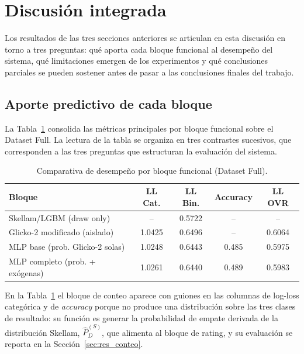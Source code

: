 
\section{Discusi\'on integrada}
\label{sec:res_discusion}

Los resultados de las tres secciones anteriores se articulan en esta discusi\'on en torno a tres preguntas: qu\'e aporta cada bloque funcional al desempe\~no del sistema, qu\'e limitaciones emergen de los experimentos y qu\'e conclusiones parciales se pueden sostener antes de pasar a las conclusiones finales del trabajo.

\subsection{Aporte predictivo de cada bloque}
\label{subsec:res_jerarquia}

La Tabla~\ref{tab:comparativa_bloques} consolida las m\'etricas principales por bloque funcional sobre el Dataset Full. La lectura de la tabla se organiza en tres contrastes sucesivos, que corresponden a las tres preguntas que estructuran la evaluaci\'on del sistema.

\begin{table}[htbp]
	\centering
	\caption{Comparativa de desempe\~no por bloque funcional (Dataset Full).}
	\label{tab:comparativa_bloques}
	\begin{tabular}{lcccc}
		\toprule
		\textbf{Bloque} & \textbf{LL Cat.} & \textbf{LL Bin.} & \textbf{Accuracy} & \textbf{LL OVR} \\
		\midrule
		Skellam/LGBM (draw only) & -- & 0.5722 & -- & -- \\
		Glicko-2 modificado (aislado) & 1.0425 & 0.6496 & -- & 0.6064 \\
		MLP base (prob. Glicko-2 solas) & 1.0248 & 0.6443 & 0.485 & 0.5975 \\
		MLP completo (prob. + ex\'ogenas) & 1.0261 & 0.6440 & 0.489 & 0.5983 \\
		\bottomrule
	\end{tabular}
\end{table}

En la Tabla~\ref{tab:comparativa_bloques} el bloque de conteo aparece con guiones en las columnas de log-loss categ\'orica y de \textit{accuracy} porque no produce una distribuci\'on sobre las tres clases de resultado: su funci\'on es generar la probabilidad de empate derivada de la distribuci\'on Skellam, $\hat{P}_D^{(S)}$, que alimenta al bloque de rating, y su evaluaci\'on se reporta en la Secci\'on~\ref{sec:res_conteo}.

